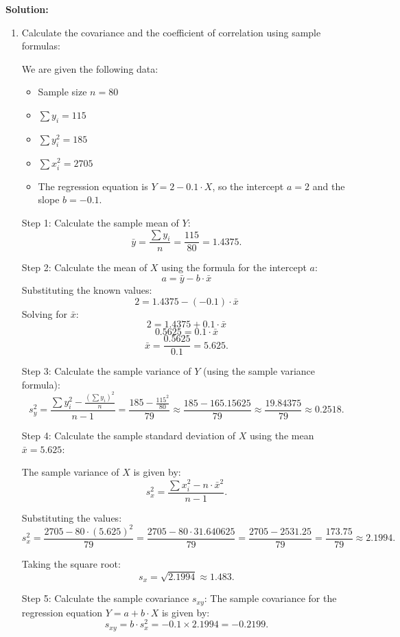 \documentclass[12pt]{article}
\begin{document}
\begin{enumerate}
{\color{blue}
\noindent \textbf{Solution:}

\begin{enumerate}
\item Calculate the covariance and the coefficient of correlation using sample formulas:

We are given the following data:

\begin{itemize}
    \item Sample size \( n = 80 \)
    \item \( \sum y_i = 115 \)
    \item \( \sum y_i^2 = 185 \)
    \item \( \sum x_i^2 = 2705 \)
    \item The regression equation is \( Y = 2 - 0.1 \cdot X \), so the intercept \( a = 2 \) and the slope \( b = -0.1 \).
\end{itemize}

Step 1: Calculate the sample mean of \( Y \):
\[
\bar{y} = \frac{\sum y_i}{n} = \frac{115}{80} = 1.4375.
\]

Step 2: Calculate the mean of \( X \) using the formula for the intercept \( a \):
\[
a = \bar{y} - b \cdot \bar{x}
\]
Substituting the known values:
\[
2 = 1.4375 - (-0.1) \cdot \bar{x}
\]
Solving for \( \bar{x} \):
\[
2 = 1.4375 + 0.1 \cdot \bar{x}
\]
\[
0.5625 = 0.1 \cdot \bar{x}
\]
\[
\bar{x} = \frac{0.5625}{0.1} = 5.625.
\]

Step 3: Calculate the sample variance of \( Y \) (using the sample variance formula):
\[
s_y^2 = \frac{\sum y_i^2 - \frac{(\sum y_i)^2}{n}}{n - 1} = \frac{185 - \frac{115^2}{80}}{79} \approx \frac{185 - 165.15625}{79} \approx \frac{19.84375}{79} \approx 0.2518.
\]

Step 4: Calculate the sample standard deviation of \( X \) using the mean \( \bar{x} = 5.625 \):

The sample variance of \( X \) is given by:
\[
s_x^2 = \frac{\sum x_i^2 - n \cdot \bar{x}^2}{n - 1}.
\]

Substituting the values:
\[
s_x^2 = \frac{2705 - 80 \cdot (5.625)^2}{79} = \frac{2705 - 80 \cdot 31.640625}{79} = \frac{2705 - 2531.25}{79} = \frac{173.75}{79} \approx 2.1994.
\]

Taking the square root:
\[
s_x = \sqrt{2.1994} \approx 1.483.
\]

Step 5: Calculate the sample covariance \( s_{xy} \):
The sample covariance for the regression equation \( Y = a + b \cdot X \) is given by:
\[
s_{xy} = b \cdot s_x^2 = -0.1 \times 2.1994 = -0.2199.
\]


\end{enumerate}}
\end{enumerate}
\end{document}
